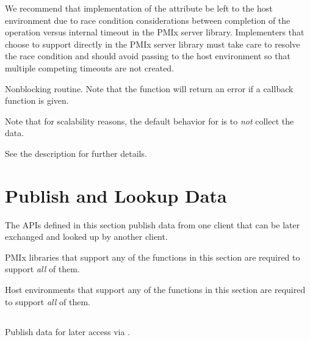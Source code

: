 
\optattrend

\adviceimplstart
We recommend that implementation of the  attribute be left to the host environment due to race condition considerations between completion of the operation versus internal timeout in the \ac{PMIx} server library. Implementers that choose to support  directly in the \ac{PMIx} server library must take care to resolve the race condition and should avoid passing  to the host environment so that multiple competing timeouts are not created.
\adviceimplend

\descr

Nonblocking  routine.
Note that the function will return an error if a  callback function is given.

Note that for scalability reasons, the default behavior for  is to \emph{not} collect the data.

See the  description for further details.

\section{Publish and Lookup Data}
\label{chap:api_kv_mgmt:publish}

The APIs defined in this section publish data from one client that can be later exchanged and looked up by another client.

\adviceimplstart
\ac{PMIx} libraries that support any of the functions in this section are required to support \textit{all} of them.
\adviceimplend

\advicermstart
Host environments that support any of the functions in this section are required to support \textit{all} of them.
\advicermend

\subsection{}

\summary

Publish data for later access via .

